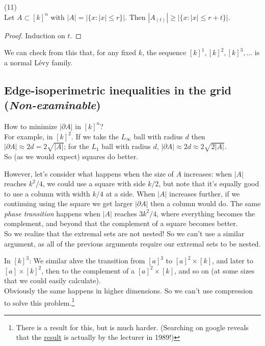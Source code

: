 \documentclass[a4paper]{article}
\begin{document}
\begin{coro} (11)\\
    Let $A \subset [k]^n$ with $|A| = |\{x:|x| \leq r\}|$. Then $|A_{(t)}| \geq |\{x:|x| \leq r+t\}|$.\\
    \begin{proof}
        Induction on $t$.
    \end{proof}
\end{coro}

\begin{rem}
    We can check from this that, for any fixed $k$, the sequence $[k]^1,[k]^2,[k]^3,...$ is a normal L\'evy family.
\end{rem}

\subsection{Edge-isoperimetric inequalities in the grid (\emph{Non-examinable})}

How to minimize $|\partial A|$ in $[k]^n$?\\
For example, in $[k]^2$. If we take the $L_\infty$ ball with radius $d$ then $|\partial A| \approx 2d = 2\sqrt{|A|}$; for the $L_1$ ball with radius $d$, $|\partial A| \approx 2d \approx 2\sqrt{2|A|}$.\\
So (as we would expect) squares do better.

However, let's consider what happens when the size of $A$ increases: when $|A|$ reaches $k^2/4$, we could use a square with side $k/2$, but note that it's equally good to use a column with width $k/4$ at a side. When $|A|$ increases further, if we continuing using the square we get larger $|\partial A|$ then a column would do. The same \emph{phase transition} happens when $|A|$ reaches $3k^2/4$, where everything becomes the complement, and beyond that the complement of a square becomes better.\\
So we realize that the extremal sets are not nested! So we can't use a similar argument, as all of the previous arguments require our extremal sets to be nested.

In $[k]^3$: We similar ahve the transition from $[a]^3$ to $[a]^2 \times [k]$, and later to $[a] \times [k]^2$, then to the complement of a $[a]^2 \times [k]$, and so on (at some sizes that we could easily calculate).\\
Obviously the same happens in higher dimensions. So we can't use compression to solve this problem.\footnote{There is a result for this, but is much harder. (Searching on google reveals that the \href{https://link.springer.com/content/pdf/10.1007/BF01275667.pdf}{result} is actually by the lecturer in 1989!)}
\end{document}
